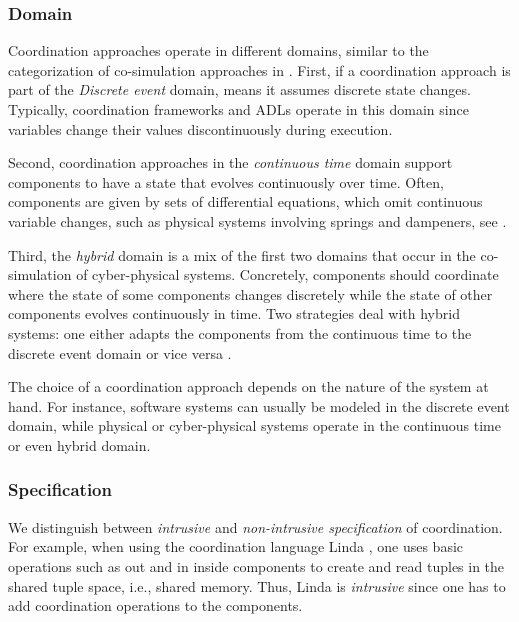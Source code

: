 \documentclass[runningheads]{llncs}
\begin{document}
\subsubsection{Domain} Coordination approaches operate in different domains, similar to the categorization of co-simulation approaches in \cite{gomesCoSimulationSurvey2019}.
First, if a coordination approach is part of the \textit{Discrete event} domain, means it assumes discrete state changes.
Typically, coordination frameworks and ADLs operate in this domain since variables change their values discontinuously during execution.

Second, coordination approaches in the \textit{continuous time} domain support components to have a state that evolves continuously over time.
Often, components are given by sets of differential equations, which omit continuous variable changes, such as physical systems involving springs and dampeners, see \cite{gomesCoSimulationSurvey2019}.

Third, the \textit{hybrid} domain is a mix of the first two domains that occur in the co-simulation of cyber-physical systems.
Concretely, components should coordinate where the state of some components changes discretely while the state of other components evolves continuously in time.
Two strategies deal with hybrid systems: one either adapts the components from the continuous time to the discrete event domain or vice versa \cite{gomesCoSimulationSurvey2019}.

The choice of a coordination approach depends on the nature of the system at hand.
For instance, software systems can usually be modeled in the discrete event domain, while physical or cyber-physical systems operate in the continuous time or even hybrid domain.

\subsubsection{Specification} We distinguish between \textit{intrusive} and \textit{non-intrusive specification} of coordination.
For example, when using the coordination language Linda \cite{carrieroLindaContext1989}, one uses basic operations such as \textsf{out} and \textsf{in} inside components to create and read tuples in the shared tuple space, i.e., shared memory.
Thus, Linda is \textit{intrusive} since one has to add coordination operations to the components.
\end{document}
